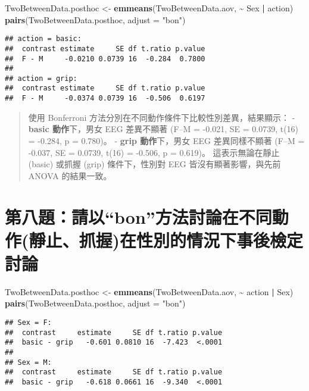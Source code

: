 \documentclass[
  12pt,
]{article}
\newenvironment{Shaded}{\begin{snugshade}}{\end{snugshade}}
\newcommand{\AttributeTok}[1]{\textcolor[rgb]{0.13,0.29,0.53}{#1}}
\newcommand{\FunctionTok}[1]{\textcolor[rgb]{0.13,0.29,0.53}{\textbf{#1}}}
\newcommand{\NormalTok}[1]{#1}
\newcommand{\OtherTok}[1]{\textcolor[rgb]{0.56,0.35,0.01}{#1}}
\newcommand{\SpecialCharTok}[1]{\textcolor[rgb]{0.81,0.36,0.00}{\textbf{#1}}}
\newcommand{\StringTok}[1]{\textcolor[rgb]{0.31,0.60,0.02}{#1}}
\begin{document}
\begin{Shaded}
\begin{Highlighting}[]
\NormalTok{TwoBetweenData.posthoc }\OtherTok{\textless{}{-}} \FunctionTok{emmeans}\NormalTok{(TwoBetweenData.aov, }\SpecialCharTok{\textasciitilde{}}\NormalTok{ Sex }\SpecialCharTok{|}\NormalTok{ action)}
\FunctionTok{pairs}\NormalTok{(TwoBetweenData.posthoc, }\AttributeTok{adjust =} \StringTok{"bon"}\NormalTok{)}
\end{Highlighting}
\end{Shaded}

\begin{verbatim}
## action = basic:
##  contrast estimate     SE df t.ratio p.value
##  F - M     -0.0210 0.0739 16  -0.284  0.7800
## 
## action = grip:
##  contrast estimate     SE df t.ratio p.value
##  F - M     -0.0374 0.0739 16  -0.506  0.6197
\end{verbatim}

\begin{quote}
使用 Bonferroni 方法分別在不同動作條件下比較性別差異，結果顯示： -
\textbf{basic 動作}下，男女 EEG 差異不顯著 (F--M = -0.021, SE = 0.0739,
t(16) = -0.284, p = 0.780)。 - \textbf{grip 動作}下，男女 EEG
差異同樣不顯著 (F--M = -0.037, SE = 0.0739, t(16) = -0.506, p = 0.619)。
這表示無論在靜止 (basic) 或抓握 (grip) 條件下，性別對 EEG
皆沒有顯著影響，與先前 ANOVA 的結果一致。
\end{quote}

\section{第八題：請以``bon''方法討論在不同動作(靜止、抓握)在性別的情況下事後檢定討論}\label{ux7b2cux516bux984cux8acbux4ee5bonux65b9ux6cd5ux8a0eux8ad6ux5728ux4e0dux540cux52d5ux4f5cux975cux6b62ux6293ux63e1ux5728ux6027ux5225ux7684ux60c5ux6cc1ux4e0bux4e8bux5f8cux6aa2ux5b9aux8a0eux8ad6}

\begin{Shaded}
\begin{Highlighting}[]
\NormalTok{TwoBetweenData.posthoc }\OtherTok{\textless{}{-}} \FunctionTok{emmeans}\NormalTok{(TwoBetweenData.aov, }\SpecialCharTok{\textasciitilde{}}\NormalTok{ action }\SpecialCharTok{|}\NormalTok{ Sex)}
\FunctionTok{pairs}\NormalTok{(TwoBetweenData.posthoc, }\AttributeTok{adjust =} \StringTok{"bon"}\NormalTok{)}
\end{Highlighting}
\end{Shaded}

\begin{verbatim}
## Sex = F:
##  contrast     estimate     SE df t.ratio p.value
##  basic - grip   -0.601 0.0810 16  -7.423  <.0001
## 
## Sex = M:
##  contrast     estimate     SE df t.ratio p.value
##  basic - grip   -0.618 0.0661 16  -9.340  <.0001
\end{verbatim}
\end{document}
